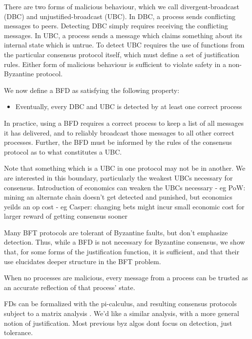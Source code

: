There are two forms of malicious behaviour, which we call divergent-broadcast (DBC)
and unjustified-broadcast (UBC). In DBC, a process sends conflicting messages to peers.
Detecting DBC simply requires receiving the conflicting messages.
In UBC, a process sends a message which claims something about its internal state which is untrue.
To detect UBC requires the use of functions from the particular consensus protocol itself,
which must define a set of justification rules.
Either form of malicious behaviour is sufficient to violate safety in a non-Byzantine protocol.

We now define a BFD as satisfying the following property:

\begin{itemize}
\item{Eventually, every DBC and UBC is detected by at least one correct process}
\end{itemize}

In practice, using a BFD requires a correct process to keep a list of all messages it has delivered,
and to reliably broadcast those messages to all other correct processes.
Further, the BFD must be informed by the rules of the consensus protocol as to what constitutes a UBC.

Note that something which is a UBC in one protocol may not be in another.
We are interested in this boundary, particularly the weakest UBCs necessary for consensus.
Introduction of economics can weaken the UBCs necessary
	- eg PoW: mining an alternate chain doesn't get detected and punished, but economics yeilds an op cost
	- eg Casper: changing bets might incur small economic cost for larger reward of getting consensus sooner


Many BFT protocols are tolerant of Byzantine faults, but don't emphasize detection.
Thus, while a BFD is not necessary for Byzantine consensus, we show that, for some 
forms of the justification function, it is sufficient,
and that their use elucidates deeper structure in the BFT problem.






When no processes are malicious,
every message from a process can be trusted as an accurate reflection of that process' state.



FDs can be formalized with the pi-calculus, 
and resulting consensus protocols subject to a matrix analysis \cite{nestmann2003modeling}.
We'd like a similar analysis, with a more general notion of justification.
Most previous byz algos dont focus on detection, just tolerance.

